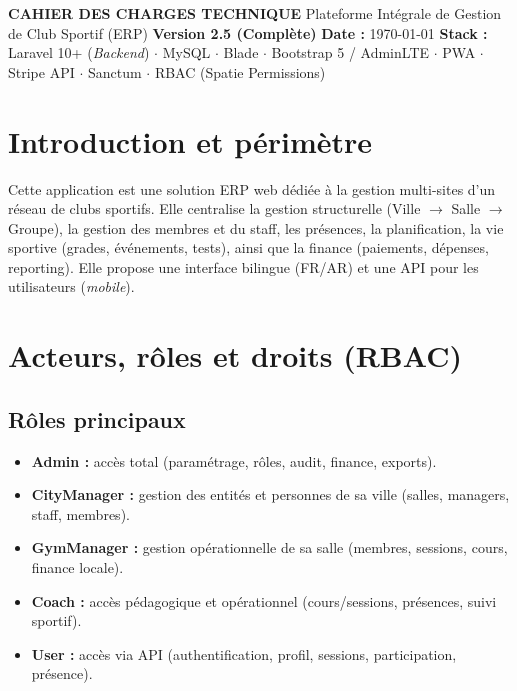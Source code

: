 \documentclass[12pt, a4paper]{article}
\begin{document}
\begin{titlepage}
    \begin{center}
        \vspace*{1cm}
        \Huge \textbf{CAHIER DES CHARGES TECHNIQUE}
        \vspace{0.5cm}
        \LARGE Plateforme Intégrale de Gestion de Club Sportif (ERP)
        \vspace{1.5cm}
        \textbf{Version 2.5 (Complète)}
        \vspace{2cm}
        \large \textbf{Date :} \today
        \vspace{4cm}
        \textbf{Stack :} \\
        Laravel 10+ (\textit{Backend}) $\cdot$ MySQL $\cdot$ Blade $\cdot$ Bootstrap 5 / AdminLTE $\cdot$ PWA $\cdot$ Stripe API $\cdot$ Sanctum $\cdot$ RBAC (Spatie Permissions)
        \vspace*{\fill}
    \end{center}
\end{titlepage}

\tableofcontents
\newpage

\section{Introduction et périmètre}
Cette application est une solution ERP web dédiée à la gestion multi-sites d'un réseau de clubs sportifs. Elle centralise la gestion structurelle (Ville $\rightarrow$ Salle $\rightarrow$ Groupe), la gestion des membres et du staff, les présences, la planification, la vie sportive (grades, événements, tests), ainsi que la finance (paiements, dépenses, reporting). Elle propose une interface bilingue (FR/AR) et une API pour les utilisateurs (\textit{mobile}).

\section{Acteurs, rôles et droits (RBAC)}
\subsection{Rôles principaux}
\begin{itemize}
    \item \textbf{Admin :} accès total (paramétrage, rôles, audit, finance, exports).
    \item \textbf{CityManager :} gestion des entités et personnes de sa ville (salles, managers, staff, membres).
    \item \textbf{GymManager :} gestion opérationnelle de sa salle (membres, sessions, cours, finance locale).
    \item \textbf{Coach :} accès pédagogique et opérationnel (cours/sessions, présences, suivi sportif).
    \item \textbf{User :} accès via API (authentification, profil, sessions, participation, présence).
\end{itemize}
\end{document}
